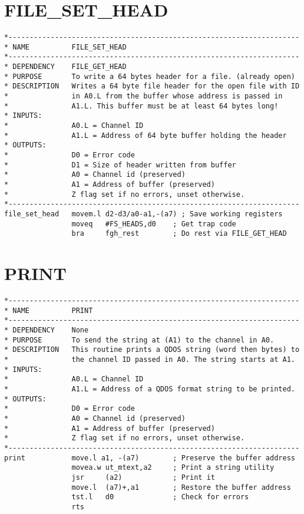 \section{FILE\_SET\_HEAD}
\label{ch9-FILE_SET_HEAD}%

\begin{lstlisting}[firstnumber=1,caption={FILE\_SET\_HEAD}]
*---------------------------------------------------------------------
* NAME          FILE_SET_HEAD
*---------------------------------------------------------------------
* DEPENDENCY    FILE_GET_HEAD
* PURPOSE       To write a 64 bytes header for a file. (already open)
* DESCRIPTION   Writes a 64 byte file header for the open file with ID
*               in A0.L from the buffer whose address is passed in
*               A1.L. This buffer must be at least 64 bytes long!
* INPUTS:
*               A0.L = Channel ID
*               A1.L = Address of 64 byte buffer holding the header
* OUTPUTS:
*               D0 = Error code
*               D1 = Size of header written from buffer
*               A0 = Channel id (preserved)
*               A1 = Address of buffer (preserved)
*               Z flag set if no errors, unset otherwise.
*---------------------------------------------------------------------
file_set_head   movem.l d2-d3/a0-a1,-(a7) ; Save working registers
                moveq   #FS_HEADS,d0    ; Get trap code
                bra     fgh_rest        ; Do rest via FILE_GET_HEAD
\end{lstlisting}

\section{PRINT}
\label{ch9-PRINT}%

\begin{lstlisting}[firstnumber=1,caption={PRINT}]
*---------------------------------------------------------------------
* NAME          PRINT
*---------------------------------------------------------------------
* DEPENDENCY    None
* PURPOSE       To send the string at (A1) to the channel in A0.
* DESCRIPTION   This routine prints a QDOS string (word then bytes) to
*               the channel ID passed in A0. The string starts at A1.
* INPUTS:
*               A0.L = Channel ID
*               A1.L = Address of a QDOS format string to be printed.
* OUTPUTS:
*               D0 = Error code
*               A0 = Channel id (preserved)
*               A1 = Address of buffer (preserved)
*               Z flag set if no errors, unset otherwise.
*---------------------------------------------------------------------
print           move.l a1, -(a7)        ; Preserve the buffer address
                movea.w ut_mtext,a2     ; Print a string utility
                jsr     (a2)            ; Print it
                move.l  (a7)+,a1        ; Restore the buffer address
                tst.l   d0              ; Check for errors
                rts
\end{lstlisting}

